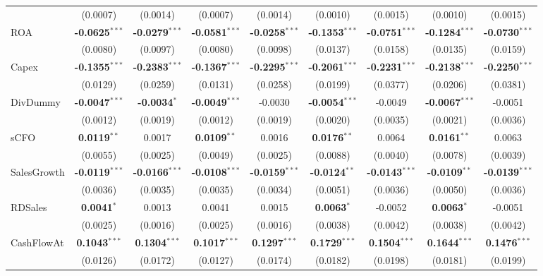 \begin{landscape}
\begin{table}[H]
\begin{tabular}{lcccccccc}
 & (0.0007) & (0.0014) & (0.0007) & (0.0014) & (0.0010) & (0.0015) & (0.0010) & (0.0015) \\
ROA & \textbf{-0.0625}$^{***}$ & \textbf{-0.0279}$^{***}$ & \textbf{-0.0581}$^{***}$ & \textbf{-0.0258}$^{***}$ & \textbf{-0.1353}$^{***}$ & \textbf{-0.0751}$^{***}$ & \textbf{-0.1284}$^{***}$ & \textbf{-0.0730}$^{***}$ \\
 & (0.0080) & (0.0097) & (0.0080) & (0.0098) & (0.0137) & (0.0158) & (0.0135) & (0.0159) \\
Capex & \textbf{-0.1355}$^{***}$ & \textbf{-0.2383}$^{***}$ & \textbf{-0.1367}$^{***}$ & \textbf{-0.2295}$^{***}$ & \textbf{-0.2061}$^{***}$ & \textbf{-0.2231}$^{***}$ & \textbf{-0.2138}$^{***}$ & \textbf{-0.2250}$^{***}$ \\
 & (0.0129) & (0.0259) & (0.0131) & (0.0258) & (0.0199) & (0.0377) & (0.0206) & (0.0381) \\
DivDummy & \textbf{-0.0047}$^{***}$ & \textbf{-0.0034}$^{*}$ & \textbf{-0.0049}$^{***}$ & -0.0030 & \textbf{-0.0054}$^{***}$ & -0.0049 & \textbf{-0.0067}$^{***}$ & -0.0051 \\
 & (0.0012) & (0.0019) & (0.0012) & (0.0019) & (0.0020) & (0.0035) & (0.0021) & (0.0036) \\
sCFO & \textbf{0.0119}$^{**}$ & 0.0017 & \textbf{0.0109}$^{**}$ & 0.0016 & \textbf{0.0176}$^{**}$ & 0.0064 & \textbf{0.0161}$^{**}$ & 0.0063 \\
 & (0.0055) & (0.0025) & (0.0049) & (0.0025) & (0.0088) & (0.0040) & (0.0078) & (0.0039) \\
SalesGrowth & \textbf{-0.0119}$^{***}$ & \textbf{-0.0166}$^{***}$ & \textbf{-0.0108}$^{***}$ & \textbf{-0.0159}$^{***}$ & \textbf{-0.0124}$^{**}$ & \textbf{-0.0143}$^{***}$ & \textbf{-0.0109}$^{**}$ & \textbf{-0.0139}$^{***}$ \\
 & (0.0036) & (0.0035) & (0.0035) & (0.0034) & (0.0051) & (0.0036) & (0.0050) & (0.0036) \\
RDSales & \textbf{0.0041}$^{*}$ & 0.0013 & 0.0041 & 0.0015 & \textbf{0.0063}$^{*}$ & -0.0052 & \textbf{0.0063}$^{*}$ & -0.0051 \\
 & (0.0025) & (0.0016) & (0.0025) & (0.0016) & (0.0038) & (0.0042) & (0.0038) & (0.0042) \\
CashFlowAt & \textbf{0.1043}$^{***}$ & \textbf{0.1304}$^{***}$ & \textbf{0.1017}$^{***}$ & \textbf{0.1297}$^{***}$ & \textbf{0.1729}$^{***}$ & \textbf{0.1504}$^{***}$ & \textbf{0.1644}$^{***}$ & \textbf{0.1476}$^{***}$ \\
 & (0.0126) & (0.0172) & (0.0127) & (0.0174) & (0.0182) & (0.0198) & (0.0181) & (0.0199) \\

\end{tabular}
\end{table}
\end{landscape}
